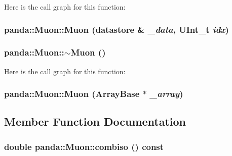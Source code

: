Here is the call graph for this function:\hypertarget{classpanda_1_1Muon_ae0f7f7985ce4cdd6031178bf136fd7f3}{
\subsubsection[{Muon}]{\setlength{\rightskip}{0pt plus 5cm}panda::Muon::Muon ({\bf datastore} \& {\em \_\-data}, \/  UInt\_\-t {\em idx})}}
\label{classpanda_1_1Muon_ae0f7f7985ce4cdd6031178bf136fd7f3}
\hypertarget{classpanda_1_1Muon_a018a7d87e4d8b9226182c8e668fa081f}{
\subsubsection[{$\sim$Muon}]{\setlength{\rightskip}{0pt plus 5cm}panda::Muon::$\sim$Muon ()}}
\label{classpanda_1_1Muon_a018a7d87e4d8b9226182c8e668fa081f}


Here is the call graph for this function:\hypertarget{classpanda_1_1Muon_a704600bf4a1fa7c7208730cd339d1680}{
\subsubsection[{Muon}]{\setlength{\rightskip}{0pt plus 5cm}panda::Muon::Muon ({\bf ArrayBase} $\ast$ {\em \_\-array})}}
\label{classpanda_1_1Muon_a704600bf4a1fa7c7208730cd339d1680}


\subsection{Member Function Documentation}
\hypertarget{classpanda_1_1Muon_a3eb5df88e49b5510c00a6f02ce61def0}{
\subsubsection[{combiso}]{\setlength{\rightskip}{0pt plus 5cm}double panda::Muon::combiso () const}}
\label{classpanda_1_1Muon_a3eb5df88e49b5510c00a6f02ce61def0}


